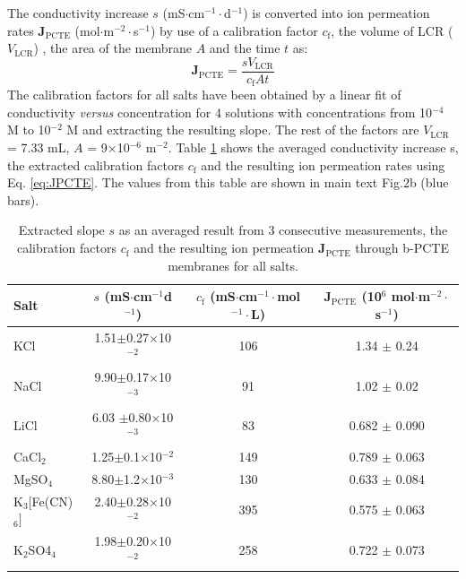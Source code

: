 \documentclass[manuscript=suppinfo,email=true, hyperref=true, keywords=false]{achemso}
\newcommand{\Fig}{Fig.}
\begin{document}
The conductivity increase $s$ (mS$\cdot$cm$^{-1}\cdot$d$^{-1}$) is
converted into ion permeation rates $\boldsymbol{J}_{\mathrm{PCTE}}$
(mol$\cdot$m$^{-2}\cdot$s$^{-1}$) by use of a calibration factor
$c_{\mathrm{f}}$, the volume of LCR ($V_{\mathrm{LCR}}$) , the area of
the membrane $A$ and the time $t$ as:
\begin{equation}
  \label{eq:JPCTE}
  \boldsymbol{J}_{\mathrm{PCTE}} = \frac{s V_{\mathrm{LCR}}}{c_{\mathrm{f}} A t}
\end{equation}
The calibration factors for all salts have been obtained by a linear
fit of conductivity \textit{versus} concentration for 4 solutions with
concentrations from 10$^{-4}$ M to 10$^{-2}$ M and extracting the
resulting slope. The rest of the factors are $V_{\mathrm{LCR}}$ = 7.33
mL, $A$ = 9$\times$10$^{-6}$ m$^{-2}$. Table \ref{tab:exp-2} shows the
averaged conductivity increase s, the extracted calibration factors
$c_{\mathrm{f}}$ and the resulting ion permeation rates using
Eq. \ref{eq:JPCTE}. The values from this table are shown in main text \Fig 2b
(blue bars).
\begin{table}[htbp]
  \centering
  \begin{tabular}{lccc}
    \hline
    Salt & $s$ (mS$\cdot$cm$^{-1}$d$^{-1}$) & $c_{\mathrm{f}}$ (mS$\cdot$cm$^{-1}\cdot$mol$^{-1}\cdot$L) &
                                                                                                            $\boldsymbol{J}_{\mathrm{PCTE}}$ (10$^{6}$ mol$\cdot$m$^{-2}\cdot$s$^{-1}$)\\
    \hline
    KCl & 1.51$\pm$0.27$\times$10$^{-2}$  & 106   & 1.34 $\pm$ 0.24\\
    NaCl        & 9.90$\pm$0.17$\times$10$^{-3}$ & 91    & 1.02 $\pm$ 0.02\\
    LiCl        & 6.03 $\pm$0.80$\times$10$^{-3}$        & 83    & 0.682 $\pm$ 0.090\\
    CaCl$_{2}$  & 1.25$\pm$0.1$\times$10$^{-2}$    & 149   & 0.789 $\pm$ 0.063\\
    MgSO$_{4}$  & 8.80$\pm$1.2$\times$10$^{-3}$   & 130   & 0.633 $\pm$ 0.084\\
    K$_{3}$[Fe(CN)$_{6}]$ & 2.40$\pm$0.28$\times$10$^{-2}$   & 395   & 0.575 $\pm$ 0.063\\
    K$_{2}$SO4$_{4}$    & 1.98$\pm$0.20$\times$10$^{-2}$  & 258   & 0.722 $\pm$ 0.073\\
    \hline
  \end{tabular}
  \caption{Extracted slope $s$ as an averaged result from 3 consecutive
    measurements, the calibration factors $c_{\mathrm{f}}$ and the resulting ion
    permeation $\boldsymbol{J}_{\mathrm{PCTE}}$ through b-PCTE membranes for all salts.}
  \label{tab:exp-2}
\end{table}
\end{document}
